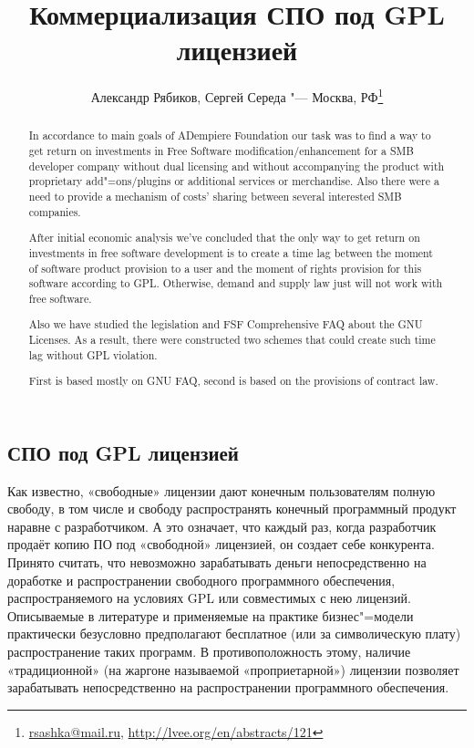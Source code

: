 \documentclass[10pt, a5paper]{article}
\begin{document}
\title{Коммерциализация СПО под GPL лицензией}
\author{Александр Рябиков, Сергей Середа "--- Москва, РФ\footnote{\url{rsashka@mail.ru}, \url{http://lvee.org/en/abstracts/121}}}
\maketitle
\begin{abstract}
In accordance to main goals of ADempiere Foundation our task was to find a way to get return on investments in Free Software modification/enhancement for a SMB developer company without dual licensing and without accompanying the product with proprietary add"=ons/plugins or additional services or merchandise. Also there were a need to provide a mechanism of costs' sharing between several interested SMB companies.

After initial economic analysis we've concluded that the only way to get return on investments in free software development is to create a time lag between the moment of software product provision to a user and the moment of rights provision for this software according to GPL. Otherwise, demand and supply law just will not work with free software.

Also we have studied the legislation and FSF Comprehensive FAQ about the GNU Licenses. As a result, there were constructed two schemes that could create such time lag without GPL violation. 

First is based mostly on GNU FAQ, second is based on the provisions of contract law.
\end{abstract}


\subsection*{СПО под GPL лицензией}

Как известно, «свободные» лицензии дают конечным пользователям полную свободу, в том числе и свободу распространять конечный программный продукт наравне с разработчиком. А это означает, что каждый раз, когда разработчик продаёт копию ПО под «свободной» лицензией, он создает себе конкурента. Принято считать, что невозможно зарабатывать деньги непосредственно на доработке и распространении свободного программного обеспечения, распространяемого на условиях GPL или совместимых с нею лицензий. Описываемые в литературе и применяемые на практике бизнес"=модели практически безусловно предполагают бесплатное (или за символическую плату) распространение таких программ. В противоположность этому, наличие «традиционной» (на жаргоне называемой «проприетарной») лицензии позволяет зарабатывать непосредственно на распространении программного обеспечения.
\end{document}
